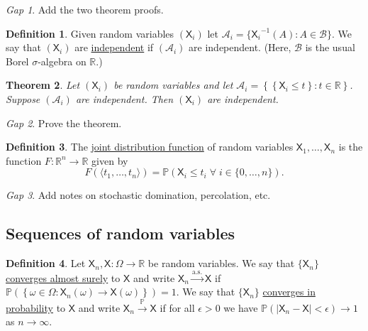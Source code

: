 \documentclass[11pt]{article}
\newcommand{\col}[1]{\mathscr{#1}}
\newcommand{\rv}[1]{\mathsf{#1}}
\newcommand{\p}{\mathbb{P}}
\newcommand{\bor}{\col{B}}
\newcommand{\defname}[1]{\underline{#1}}
\newcommand{\asto}{\xrightarrow{\text{a.s.}}}
\newcommand{\pto}{\xrightarrow{\p}}
\newcommand{\RR}{\mathbb{R}}
\theoremstyle{theorem}
\newtheorem{theorem}{Theorem}[section]
\theoremstyle{definition}
\newtheorem{definition}[theorem]{Definition}
\theoremstyle{remark}
\theoremstyle{step}
\theoremstyle{gap}
\newtheorem*{gap}{Gap}
\begin{document}
\begin{gap}
Add the two theorem proofs.
\end{gap}

\begin{definition}
Given random variables \((\rv{X}_i)\) let \(\col{A}_i = \{{\rv{X}_i}^{-1}(A) : A \in \bor\}\). We say that \((\rv{X}_i)\) are \defname{independent} if \((\col{A}_i)\) are independent. (Here, \(\bor\) is the usual Borel \(\sigma\)-algebra on \(\RR\).)
\end{definition}

\begin{theorem}
Let \((\rv{X}_i)\) be random variables and let \(\col{A}_i = \left\{\left\{\rv{X}_i \leq t\right\} : t \in \RR\right\}\). Suppose \((\col{A}_i)\) are independent. Then \((\rv{X}_i)\) are independent.
\end{theorem}

\begin{gap}
Prove the theorem.
\end{gap}

\begin{definition}
The \defname{joint distribution function} of random variables \(\rv{X}_1, \ldots, \rv{X}_n\) is the function \(F:\RR^n \to \RR\) given by \[F\left(\langle t_1, \ldots, t_n\rangle\right) = \p \left(\rv{X}_i \leq t_i \;\forall\; i \in \{0, \ldots, n\}\right).\]
\end{definition}

\begin{gap}
Add notes on stochastic domination, percolation, etc.
\end{gap}

\subsection{Sequences of random variables}

\begin{definition}
Let \(\rv{X}_n, \rv{X} : \Omega\to \RR\) be random variables. We say that \(\{\rv{X}_n\}\) \defname{converges almost surely} to \(\rv{X}\) and write \(\rv{X}_n \asto \rv{X}\) if \(\p\left(\left\{\omega \in \Omega : \rv{X}_n(\omega) \to \rv{X}(\omega)\right\}\right) = 1\). We say that \(\{\rv{X}_n\}\) \defname{converges in probability} to \(\rv{X}\) and write \(\rv{X}_n \pto \rv{X}\) if for all \(\epsilon>0\) we have \(\p\left(\left|\rv{X}_n-\rv{X}\right| < \epsilon\right) \to 1\) as \(n \to \infty\).
\end{definition}
\end{document}

